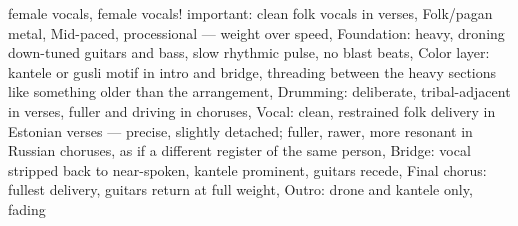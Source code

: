 
\label{sec:petrovna}

\begin{notes}
\end{notes}

\begin{style}
female vocals, female vocals! important: clean folk vocals in verses, Folk/pagan metal, Mid-paced, processional — weight over speed, Foundation: heavy, droning down-tuned guitars and bass, slow rhythmic pulse, no blast beats, Color layer: kantele or gusli motif in intro and bridge, threading between the heavy sections like something older than the arrangement, Drumming: deliberate, tribal-adjacent in verses, fuller and driving in choruses, Vocal: clean, restrained folk delivery in Estonian verses — precise, slightly detached; fuller, rawer, more resonant in Russian choruses, as if a different register of the same person, Bridge: vocal stripped back to near-spoken, kantele prominent, guitars recede, Final chorus: fullest delivery, guitars return at full weight, Outro: drone and kantele only, fading
\end{style}

